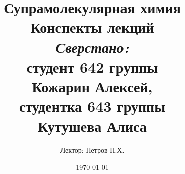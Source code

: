 
\author{Лектор: Петров Н.Х.}



\title{
	\textbf{Супрамолекулярная химия} \\
	\vspace{1in}
	{Конспекты лекций} \\
	\vspace{2.5in}
	\raggedleft \large \emph{Сверстано:}\\ 
		студент 642 группы\\ 
		Кожарин Алексей, \\
		студентка 643 группы \\
		Кутушева Алиса
}

\date{\today} %

